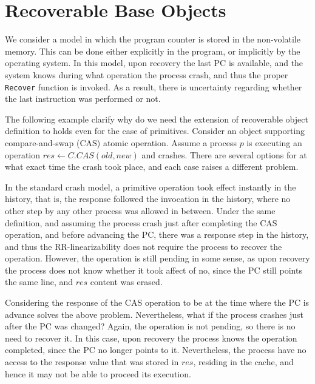 
\section{Recoverable Base Objects}
\label{section: Recoverable Base Objects}

We consider a model in which the program counter is stored in the non-volatile memory. This can be done either explicitly in the program, or implicitly by the operating system. In this model, upon recovery the last PC is available, and the system knows during what operation the process crash, and thus the proper \texttt{Recover} function is invoked. As a result, there is uncertainty regarding whether the last instruction was performed or not.

The following example clarify why do we need the extension of recoverable object definition to holds even for the case of primitives.
Consider an object supporting compare-and-swap (CAS) atomic operation. Assume a process $p$ is executing an operation $res \leftarrow C.CAS(old,new)$ and crashes. There are several options for at what exact time the crash took place, and each case raises a different problem.

In the standard crash model, a primitive operation took effect instantly in the history, that is, the response followed the invocation in the history, where no other step by any other process was allowed in between. Under the same definition, and assuming the process crash just after completing the CAS operation, and before advancing the PC, there was a response step in the history, and thus the RR-linearizability does not require the process to recover the operation. However, the operation is still pending in some sense, as upon recovery the process does not know whether it took affect of no, since the PC still points the same line, and $res$ content was erased.

Considering the response of the CAS operation to be at the time where the PC is advance solves the above problem. Nevertheless, what if the process crashes just after the PC was changed? Again, the operation is not pending, so there is no need to recover it. In this case, upon recovery the process knows the operation completed, since the PC no longer points to it. Nevertheless, the process have no access to the response value that was stored in $res$, residing in the cache, and hence it may not be able to proceed its execution.

